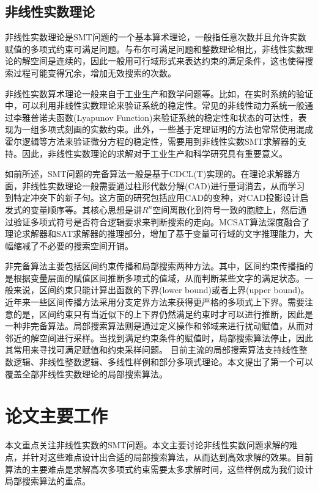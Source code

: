 \subsection{非线性实数理论}
非线性实数理论是SMT问题的一个基本算术理论，一般指任意次数并且允许实数赋值的多项式约束可满足问题。与布尔可满足问题和整数理论相比，非线性实数理论的解空间是连续的，因此一般用可行域形式来表达约束的满足条件，这也使得搜索过程可能变得冗余，增加无效搜索的次数。

非线性实数算术理论一般来自于工业生产和数学问题等。比如，在实时系统的验证中，可以利用非线性实数理论来验证系统的稳定性\cite{CPS1,CPS2,CPS3}。常见的非线性动力系统一般通过李雅普诺夫函数(Lyapunov Function)来验证系统的稳定性和状态的可达性，表现为一组多项式刻画的实数约束。此外，一些基于定理证明的方法也常常使用混成霍尔逻辑等方法来验证微分方程的稳定性，需要用到非线性实数SMT求解器的支持。因此，非线性实数理论的求解对于工业生产和科学研究具有重要意义。

如前所述，SMT问题的完备算法一般是基于CDCL(T)实现的。在理论求解器方面，非线性实数理论一般需要通过柱形代数分解(CAD)\cite{Caviness2004QuantifierEA}进行量词消去，从而学习到特定冲突下的新子句。这方面的研究包括应用CAD的变种\cite{AbrahamDEK21}，对CAD投影设计启发式的变量顺序\cite{LiXZZ23}等。其核心思想是讲$R^n$空间离散化到符号一致的胞腔上，然后通过验证多项式符号是否符合逻辑要求来判断搜索的走向。MCSAT算法深度融合了理论求解器和SAT求解器的推理部分，增加了基于变量可行域的文字推理能力，大幅缩减了不必要的搜索空间开销。

非完备算法主要包括区间约束传播和局部搜索两种方法。其中，区间约束传播指的是根据变量层面的赋值区间推断多项式的值域，从而判断某些文字的满足状态。一般来说，区间约束只能计算出函数的下界(lower bound)或者上界(upper bound)。近年来一些区间传播方法采用分支定界方法来获得更严格的多项式上下界。需要注意的是，区间约束只有当近似下的上下界仍然满足约束时才可以进行推断，因此是一种非完备算法。局部搜索算法则是通过定义操作和邻域来进行扰动赋值，从而对邻近的解空间进行采样。当找到满足约束条件的赋值时，局部搜索算法停止，因此其常用来寻找可满足赋值和约束采样问题。
目前主流的局部搜索算法支持线性整数逻辑\cite{CaiLZ22}、非线性整数逻辑\cite{CaiLZ2023}、多线性样例\cite{multilinear}和部分多项式理论\cite{LiXZ23}。本文提出了第一个可以覆盖全部非线性实数理论的局部搜索算法。

\section{论文主要工作}
本文重点关注非线性实数的SMT问题。本文主要讨论非线性实数问题求解的难点，并针对这些难点设计出合适的局部搜索算法，从而达到高效求解的效果。目前算法的主要难点是求解高次多项式约束需要太多求解时间，这些样例成为我们设计局部搜索算法的重点。

